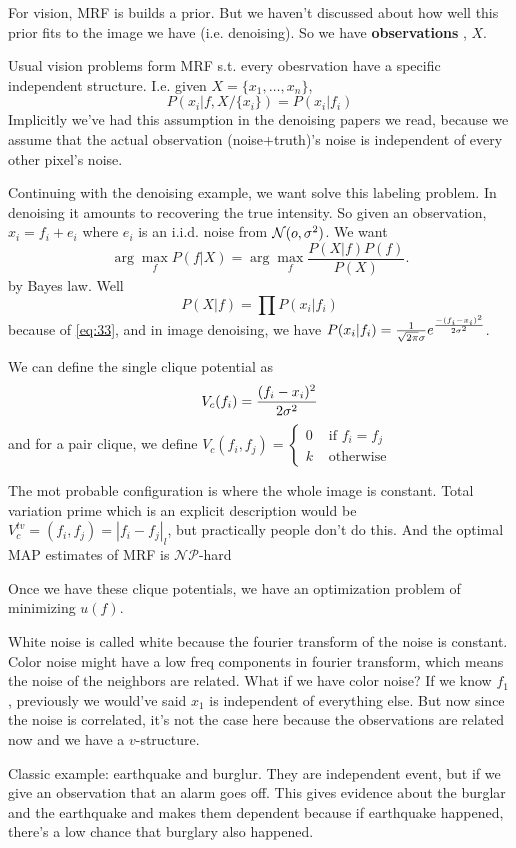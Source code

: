 For vision, MRF is builds a prior. But we haven't discussed about how
well this prior fits to the image we have (i.e. denoising). So we have
\textbf{observations} , $X$. 

Usual vision problems form MRF s.t. every obesrvation have a specific
independent structure. 
I.e. given $X=\{x_1, \dots,x_n\}$,
\begin{equation}
P(x_i | f, X/\{x_i\}) = P(x_i | f_i)\label{eq:33}
\end{equation}
Implicitly we've had this assumption in the denoising papers we read,
because we assume that the actual observation (noise+truth)'s noise is
independent of every other pixel's noise. 

Continuing with the denoising example, we want solve this labeling
problem. In denoising it amounts to recovering the true intensity.
So given an observation, $x_i = f_i + e_i$ where $e_i$ is an
i.i.d. noise from $\mathcal{N}(o, \sigma^2)$. We want
$$ \arg\max_f P(f | X)= \arg\max_f\frac{P(X|f) P(f)}{P(X)}.$$ by Bayes
law. Well $$P(X|f) = \prod P(x_i | f_i)$$   because of \eqref{eq:33},
and in image denoising, we have $P(x_i | f_i) =
\frac{1}{\sqrt{2\pi}\sigma}e^{ \frac{-(f_i-x_i)^2}{2\sigma^2}}$.

We can define the single clique potential as $$V_c(f_i) = \frac{(f_i -
  x_i)^2}{2\sigma^2}$$ and for a pair clique, we define $V_c(f_i, f_j) =\begin{cases}
0 & \text{ if }  f_i = f_j\\
k & \text{ otherwise}
\end{cases}
$

The mot probable configuration is where the whole image is
constant. Total variation prime which is an explicit description would be $V_c^{tv} = (f_i, f_j) = |f_i
- f_j|_l$, but practically people don't do this. And the optimal MAP estimates of MRF is
$\mathcal{NP}$-hard 

Once we have these clique potentials, we have an optimization problem
of minimizing $u(f)$. 

White noise is called white because the fourier transform of the noise
is constant. Color noise might have a low freq components in fourier
transform, which means the noise of the neighbors are related. What if
we have color noise?
If we know $f_1$, previously we would've said $x_1$ is independent of
everything else. But now since the noise is correlated, it's not the
case here because the observations are related now and we have a
$v$-structure. 

Classic example: earthquake and burglur. They are independent event,
but if we give an observation that an alarm goes off. This gives
evidence about the burglar and the earthquake and makes them dependent
because if earthquake happened, there's a low chance that burglary
also happened.

